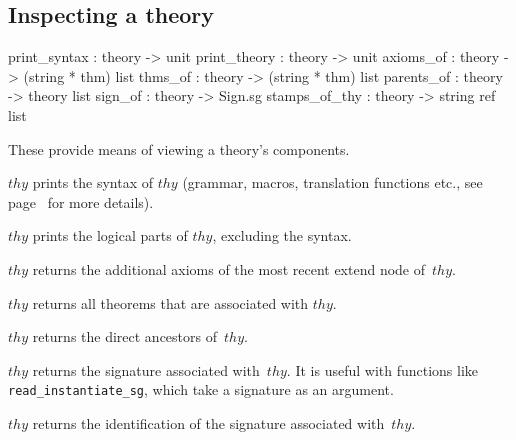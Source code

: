 \subsection{Inspecting a theory}\label{sec:inspct-thy}
\begin{ttbox}
print_syntax  : theory -> unit
print_theory  : theory -> unit
axioms_of     : theory -> (string * thm) list
thms_of       : theory -> (string * thm) list
parents_of    : theory -> theory list
sign_of       : theory -> Sign.sg
stamps_of_thy : theory -> string ref list
\end{ttbox}
These provide means of viewing a theory's components.
\begin{ttdescription}
\item[\ttindexbold{print_syntax} $thy$] prints the syntax of $thy$
  (grammar, macros, translation functions etc., see
  page~\pageref{pg:print_syn} for more details).
  
\item[\ttindexbold{print_theory} $thy$] prints the logical parts of
  $thy$, excluding the syntax.

\item[\ttindexbold{axioms_of} $thy$]
returns the additional axioms of the most recent extend node of~$thy$.

\item[\ttindexbold{thms_of} $thy$]
returns all theorems that are associated with $thy$.

\item[\ttindexbold{parents_of} $thy$]
returns the direct ancestors of~$thy$.

\item[\ttindexbold{sign_of} $thy$]
returns the signature associated with~$thy$.  It is useful with functions
like {\tt read_instantiate_sg}, which take a signature as an argument.

\item[\ttindexbold{stamps_of_thy} $thy$]
returns the identification  of the signature associated
with~$thy$.
\end{ttdescription}

